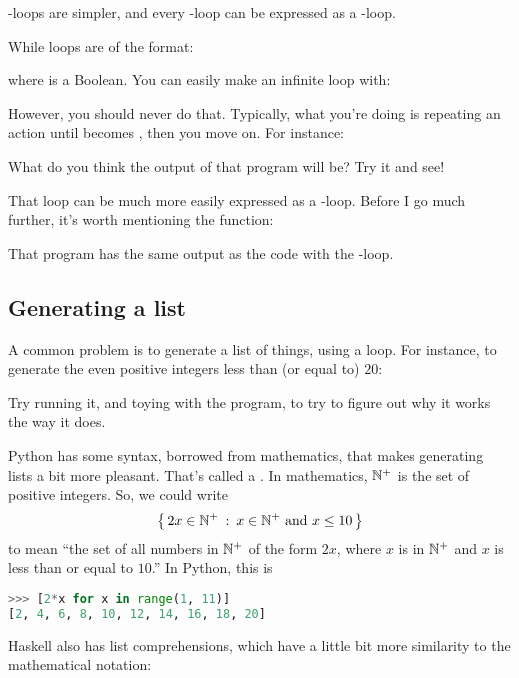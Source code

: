 -loops are simpler, and every -loop can be
expressed as a -loop.

While loops are of the format:


where  is a Boolean. You can easily make an infinite loop
with:


However, you should never do that. Typically, what you're doing is
repeating an action until  becomes \False, then you move
on. For instance:


What do you think the output of that program will be? Try it and see!

That loop can be much more easily expressed as a
-loop. Before I go much further, it's worth mentioning the
 function:


That program has the same output as the code with the
-loop.

\subsection{Generating a list}

A common problem is to generate a list of things, using a loop. For
instance, to generate the even positive integers less than (or equal
to) $20$:


Try running it, and toying with the program, to try to figure out why
it works the way it does.

Python has some syntax, borrowed from mathematics, that makes
generating lists a bit more pleasant. That's called a
. In mathematics, $\mathbb{N^{+}}$ is the set of positive
integers. So, we could write
$$\left\{\, 2x \in \mathbb{N^{+}} \::\: x \in \mathbb{N^{+}} \text{ and } x \le 10 \,\right\}$$ to mean ``the
set of all numbers in $\mathbb{N^{+}}$ of the form $2x$, where $x$ is in $\mathbb{N^{+}}$
and $x$ is less than or equal to $10$.'' In Python, this is

\begin{lstlisting}[language=Python]
>>> [2*x for x in range(1, 11)]
[2, 4, 6, 8, 10, 12, 14, 16, 18, 20]
\end{lstlisting}

Haskell also has list comprehensions, which have a little bit more
similarity to the mathematical notation:


